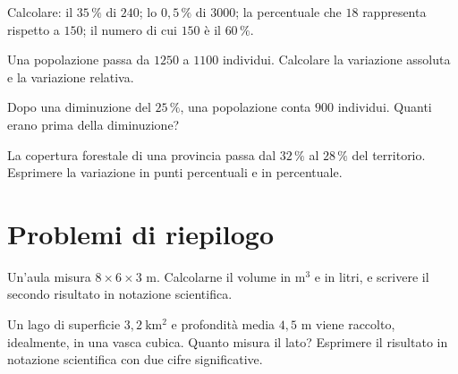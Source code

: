 \begin{esercizio}[\liv{1}]
Calcolare: il $35\,\%$ di $240$; lo $0{,}5\,\%$ di $3000$; la percentuale che $18$ rappresenta rispetto a $150$; il numero di cui $150$ \`e il $60\,\%$.
\end{esercizio}

\begin{esercizio}[\liv{1}]
Una popolazione passa da $1250$ a $1100$ individui. Calcolare la variazione assoluta e la variazione relativa.
\end{esercizio}

\begin{esercizio}[\liv{2}]
Dopo una diminuzione del $25\,\%$, una popolazione conta $900$ individui. Quanti erano prima della diminuzione?
\end{esercizio}

\begin{esercizio}[\liv{2}]
La copertura forestale di una provincia passa dal $32\,\%$ al $28\,\%$ del territorio. Esprimere la variazione in punti percentuali e in percentuale.
\end{esercizio}

\section{Problemi di riepilogo}

\begin{esercizio}[\liv{1}]
Un'aula misura $8\times6\times3$ m. Calcolarne il volume in $\mathrm{m^3}$ e in litri, e scrivere il secondo risultato in notazione scientifica.
\end{esercizio}

\begin{esercizio}[\liv{2}]
Un lago di superficie $3{,}2\ \mathrm{km^2}$ e profondità media $4{,}5$ m viene raccolto, idealmente, in una vasca cubica. Quanto misura il lato? Esprimere il risultato in notazione scientifica con due cifre significative.
\end{esercizio}

\stampasoluzioni
